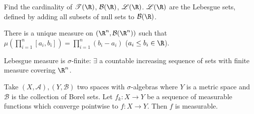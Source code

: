 \documentclass{article}
\begin{document}
\begin{ex}
    Find the cardinality of $\mathscr{T}(\R)$, $\mathcal{B}(\R)$, $\mathscr{L}(\R)$. $\mathscr{L}(\R)$ are the Lebesgue sets, defined by adding all subsets of null sets to $\mathcal{B}(\R)$.
\end{ex}

\begin{thm}
    There is a unique measure on $(\R^n, \mathcal{B}(\R^n))$ such that $\mu\left(\prod_{i=1}^n [a_i, b_i]\right) = \prod_{i=1}^n (b_i - a_i)$ ($a_i \leq b_i \in \R$).
\end{thm}

\begin{remark}
    Lebesgue measure is $\sigma$-finite: $\exists$ a countable increasing sequence of sets with finite measure covering $\R^n$.
\end{remark}


\begin{prop}
    Take $(X, \mathscr{A}), (Y, \mathscr{B})$ two spaces with $\sigma$-algebras where $Y$ is a metric space and $\mathscr{B}$ is the collection of Borel sets.
    Let $f_k: X \to Y$ be a sequence of measurable functions which converge pointwise to $f:X \to Y$.
    Then $f$ is measurable.
\end{prop}
\end{document}
